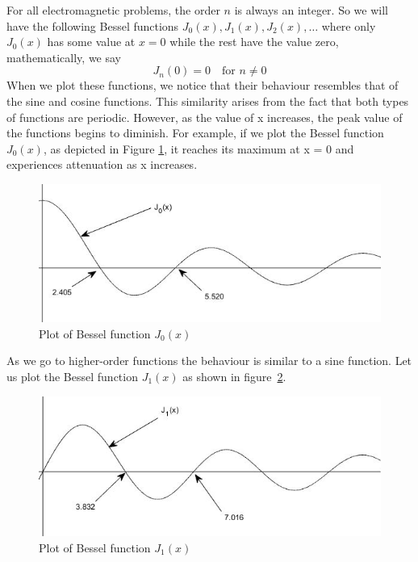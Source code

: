 For all electromagnetic problems, the order $n$ is always an integer. So we will have the following Bessel functions $ J_0(x), J_1(x), J_2(x), \ldots$ where only $J_0(x)$ has some value at $x=0$ while the rest have the value zero, mathematically, we say 
\[
J_n(0)=0\quad\text{for }n \neq 0
\]
When we plot these functions, we notice that their behaviour resembles that of the sine and cosine functions. This similarity arises from the fact that both types of functions are periodic. However, as the value of x increases, the peak value of the functions begins to diminish. For example, if we plot the Bessel function $J_0(x)$, as depicted in Figure \ref{fig:fig1}, it reaches its maximum at x = 0 and experiences attenuation as x increases.
\begin{figure}[h]
\centering
\includegraphics[width=1\linewidth]{./graphics/fig_1.1}
\caption{Plot of Bessel function $J_0(x)$}
\label{fig:fig1}
\end{figure}

As we go to higher-order functions the behaviour is similar to a sine function. Let us plot the Bessel function $J_1(x)$ as shown in figure~\ref{fig:fig2}.
\begin{figure}[h]
\centering
\includegraphics[width=1\linewidth]{./graphics/fig_2.1}
\caption{Plot of Bessel function $J_1(x)$}
\label{fig:fig2}
\end{figure}

